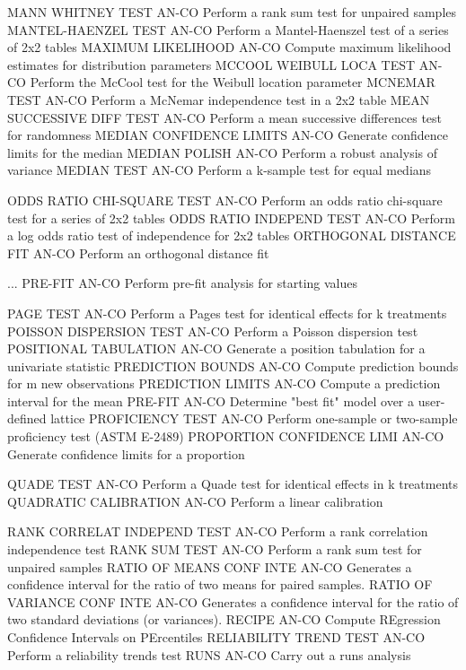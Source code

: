 MANN WHITNEY TEST           AN-CO Perform a rank sum test for unpaired samples
MANTEL-HAENZEL TEST         AN-CO Perform a Mantel-Haenszel test of a series of 2x2 tables
MAXIMUM LIKELIHOOD          AN-CO Compute maximum likelihood estimates for distribution parameters
MCCOOL WEIBULL LOCA TEST    AN-CO Perform the McCool test for the Weibull location parameter
MCNEMAR TEST                AN-CO Perform a McNemar independence test in a 2x2 table
MEAN SUCCESSIVE DIFF TEST   AN-CO Perform a mean successive differences test for randomness
MEDIAN CONFIDENCE LIMITS    AN-CO Generate confidence limits for the median
MEDIAN POLISH               AN-CO Perform a robust analysis of variance
MEDIAN TEST                 AN-CO Perform a k-sample test for equal medians

ODDS RATIO CHI-SQUARE TEST  AN-CO Perform an odds ratio chi-square test for a series of 2x2 tables
ODDS RATIO INDEPEND TEST    AN-CO Perform a log odds ratio test of independence for 2x2 tables
ORTHOGONAL DISTANCE FIT     AN-CO Perform an orthogonal distance fit

... PRE-FIT                 AN-CO Perform pre-fit analysis for starting values

PAGE TEST                   AN-CO Perform a Pages test for identical effects for k treatments
POISSON DISPERSION TEST     AN-CO Perform a Poisson dispersion test
POSITIONAL TABULATION       AN-CO Generate a position tabulation for a univariate statistic
PREDICTION BOUNDS           AN-CO Compute prediction bounds for m new observations
PREDICTION LIMITS           AN-CO Compute a prediction interval for the mean
PRE-FIT                     AN-CO Determine "best fit" model over a user-defined lattice
PROFICIENCY TEST            AN-CO Perform one-sample or two-sample proficiency test (ASTM E-2489)
PROPORTION CONFIDENCE LIMI  AN-CO Generate confidence limits for a proportion

QUADE TEST                  AN-CO Perform a Quade test for identical effects in k treatments
QUADRATIC CALIBRATION       AN-CO Perform a linear calibration

RANK CORRELAT INDEPEND TEST AN-CO Perform a rank correlation independence test
RANK SUM TEST               AN-CO Perform a rank sum test for unpaired samples
RATIO OF MEANS CONF INTE    AN-CO Generates a confidence interval for the ratio of two means for paired samples.
RATIO OF VARIANCE CONF INTE AN-CO Generates a confidence interval for the ratio of two standard deviations (or variances).
RECIPE                      AN-CO Compute REgression Confidence Intervals on PErcentiles
RELIABILITY TREND TEST      AN-CO Perform a reliability trends test
RUNS                        AN-CO Carry out a runs analysis

